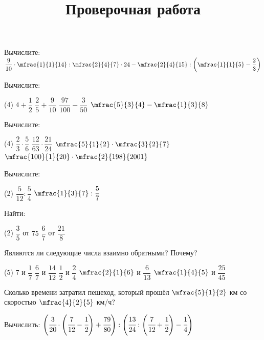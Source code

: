 \begin{homework}[number=2]
\begin{listofex}
\begin{minipage}[c]{0.4\linewidth}
	 	\end{minipage}
 		\item Вычислите:	\( \dfrac{9}{10}\cdot\mfrac{1}{1}{14}:\mfrac{2}{4}{7}\cdot24-\mfrac{2}{4}{15}:\left( \mfrac{1}{1}{5}-\dfrac{2}{3} \right) \)
	\end{listofex}
\end{homework}

%
%
\begin{exam}
	\title{Проверочная работа}
	\begin{listofex}
		\item Вычислите:
		\begin{tasks}(4)
			\task \( 4+\dfrac{1}{2} \)
			\task \( \dfrac{2}{5}+\dfrac{9}{10} \)
			\task \( \dfrac{97}{100}-\dfrac{3}{50} \)
			\task \( \mfrac{5}{3}{4}-\mfrac{1}{3}{8} \)
		\end{tasks}
		\item Вычислите:
		\begin{tasks}(4)
			\task \( \dfrac{2}{3}\cdot\dfrac{5}{6} \)
			\task \( \dfrac{12}{63}\cdot\dfrac{21}{24} \)
			\task \( \mfrac{5}{1}{2}\cdot\mfrac{3}{2}{7} \)
			\task \( \mfrac{100}{1}{20}\cdot\mfrac{2}{198}{2001} \)
		\end{tasks}
		\item Вычислите:
		\begin{tasks}(2)
			\task \( \dfrac{5}{12}:\dfrac{5}{4} \)
			\task \( \mfrac{1}{3}{7}:\dfrac{5}{7} \)
		\end{tasks}
		\item Найти:
		\begin{tasks}(2)
			\task \( \dfrac{3}{5} \) от \( 75 \)
			\task \( \dfrac{6}{7} \) от \( \dfrac{21}{8} \)
		\end{tasks}
		\item Являются ли следующие числа взаимно обратными? Почему?
		\begin{tasks}(5)
			\task \( 7 \) и \( \dfrac{1}{7} \)
			\task \( \dfrac{6}{7} \) и \( \dfrac{14}{12} \)
			\task \( \dfrac{1}{2} \) и \( \dfrac{2}{4} \)
			\task \( \mfrac{2}{1}{6} \) и \( \dfrac{6}{13} \)
			\task \( \mfrac{1}{4}{5} \) и \( \dfrac{25}{45} \)
		\end{tasks}
		\item Сколько времени затратил пешеход, который прошёл \( \mfrac{5}{1}{2} \) км со скоростью \( \mfrac{4}{2}{5} \) км/ч?
		\item Вычислить: \( \left( \cfrac{3}{20}\cdot\left( \cfrac{7}{12}-\cfrac{1}{2} \right)+\cfrac{79}{80} \right):\left( \cfrac{13}{24}:\left( \cfrac{7}{12}+\cfrac{1}{2} \right)-\cfrac{1}{4} \right) \)
	\end{listofex}
\end{exam}

